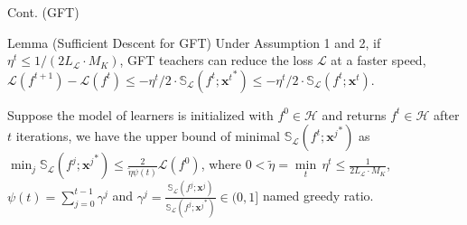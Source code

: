 \documentclass[aspectratio=169,xcolor=dvipsnames]{beamer}
\begin{document}
\begin{frame}{Cont. (GFT)}
\begin{block}{Lemma (Sufficient Descent for GFT)} Under Assumption 1 and 2, if $\eta^t\leq 1/(2L_\mathcal{L}\cdot M_K)$, GFT teachers can reduce the loss $\mathcal{L}$ at a \alert{faster speed}, 
$\mathcal{L}(f^{t+1})-\mathcal{L}(f^t)\leq-\eta^t/2\cdot\mathbb{S}_{\mathcal{L}}(f^t;{\bm{x}^t}^*)\leq-\eta^t/2\cdot\mathbb{S}_{\mathcal{L}}(f^t;{\bm{x}^t})$.
\end{block}
\begin{theorem}
        Suppose the model of learners is initialized with $f^0\in\mathcal{H}$ and returns $f^t\in\mathcal{H}$ after $t$ iterations, we have the \alert{upper bound of minimal $\mathbb{S}_{\mathcal{L}}(f^t;{\bm{x}^j}^*)$} as $\min_j\mathbb{S}_{\mathcal{L}}(f^j;{\bm{x}^j}^*)\leq\frac{2}{\tilde{\eta}\psi(t)}\mathcal{L}(f^0)$, where $0<\tilde{\eta}=\underset{t}{\min}\,\eta^t\leq \frac{1}{2L_\mathcal{L}\cdot M_K}$, $\psi(t)=\sum_{j=0}^{t-1}\gamma^j$ and $\gamma^j = \frac{\mathbb{S}_{\mathcal{L}}(f^j;{\bm{x}^j})}{\mathbb{S}_{\mathcal{L}}(f^j;{\bm{x}^j}^*)}\in(0,1]$ named greedy ratio.
\end{theorem}    
\end{frame}

\end{document}
